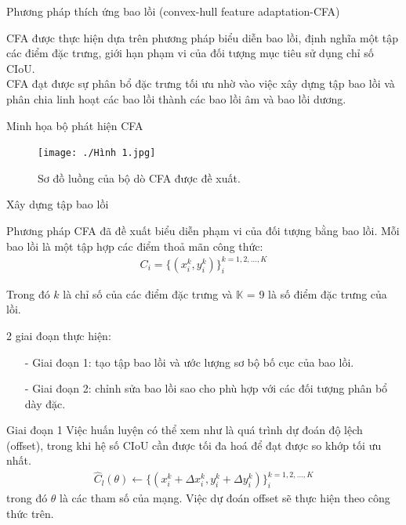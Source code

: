 \documentclass[11pt]{beamer}
\theoremstyle{definition}
\theoremstyle{plain}
\theoremstyle{plain}
\theoremstyle{remark}
\begin{document}
\begin{frame}{Phương pháp thích ứng bao lồi (convex-hull feature adaptation-CFA)}

CFA được thực hiện dựa trên phương pháp biểu diễn bao lồi, định nghĩa một tập các điểm đặc trưng, giới hạn phạm vi của đối tượng mục tiêu sử dụng chỉ số CIoU.\\
CFA đạt được sự phân bổ đặc trưng tối ưu nhờ vào việc xây dựng tập bao lồi và phân
chia linh hoạt các bao lồi thành các bao lồi âm và bao lồi dương.\\



\end{frame}
\begin{frame}{Minh họa bộ phát hiện CFA}
	\begin{figure}[htp]
		\begin{center}
			\texttt{[image: ./Hình 1.jpg]}
			\caption{Sơ đồ luồng của bộ dò CFA được đề xuất.}
			\label{fig_dhandang1 }
		\end{center}
	\end{figure}
\end{frame}
\begin{frame}{Xây dựng tập bao lồi}
	
	Phương pháp CFA đã đề xuất biểu diễn phạm
	vi của đối tượng bằng bao lồi. Mỗi bao lồi là một tập hợp các điểm thoả mãn
	công thức:
	\begin{align} \label{ptdd}
		C_i = \{(x_i^k, y_i^k )\}_i^{k=1,2,...,K}
	\end{align}
	
	Trong đó $k$ là chỉ số của các điểm đặc trưng và $\mathbb{K}$ = 9 là số điểm đặc trưng của lồi. 
	
	
\end{frame}
\begin{frame}{2 giai đoạn thực hiện:}
	\begin{itemize}
		\item[-]  Giai đoạn 1: tạo tập bao lồi và ước lượng sơ bộ bố cục của bao lồi.
		
		\item[-] Giai đoạn 2: chỉnh sửa bao lồi sao cho phù hợp với các đối tượng phân bổ dày đặc.
		
	\end{itemize}
\end{frame}


\begin{frame}{Giai đoạn 1}
	Việc huấn luyện có thể xem như là quá trình dự đoán độ lệch (offset), trong
	khi hệ số CIoU cần được tối đa hoá để đạt được so khớp tối ưu nhất.
	\begin{align} \label{ptdd}
		\widehat C_l (\theta) \gets \{(x_i^k + \Delta x_i^k, y_i^k + \Delta y_i^k )\}_i^{k=1,2,...,K}
	\end{align}
	trong đó $\theta$ là các tham số của mạng. Việc dự đoán offset sẽ thực
	hiện theo công thức trên.
\end{frame}
\end{document}
